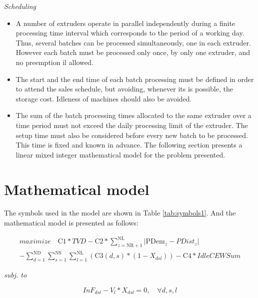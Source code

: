 \emph{Scheduling}

\begin{itemize}
\item A number of extruders operate in parallel independently during a finite processing time interval which corresponds to the period of a working day. Thus, several batches can be processed simultaneously, one in each extruder. However each batch must be processed only once, by only one extruder, and no preemption il allowed. 
\item The start and the end time of each batch processing must be defined in order to attend the sales schedule, but avoiding, whenever its is possible, the storage cost. Idleness of machines should also be avoided.
\item The sum of the batch processing times allocated to the same extruder over a time period must not exceed the daily processing limit of the extruder. The setup time must also be considered before every new batch to be processed. This time is fixed and known in advance. The following section presents a linear mixed integer mathematical model for the problem presented.
\end{itemize}

\section{Mathematical model}

The symbols used in the model are shown in Table \ref{tab:symbols1}. And the mathematical model is
presented as follows:

\begin{eqnarray} 
\label{eq:objFunc}
	 maximize \quad 
	 \mathrm{C1}*TVD 
	 - \mathrm{C2}*\sum_{z=\mathrm{NR}+1}^{\mathrm{NL}}{|\mathrm{PDem}_{z} 
	 - PDist_{z}|} \\ \nonumber 
	- \sum_{d=1}^{\mathrm{ND}}{\sum_{s=1}^{\mathrm{NS}}{\sum_{l=1}^{\mathrm{NL}}{(\mathrm{C3}(d,s)*(1-X_{dsl}))}}} - \mathrm{C4}*IdleCEWSum
\end{eqnarray}

\emph{subj. to}

\begin{equation}
	InF_{dsl} - V_{l} * X_{dsl} = 0, \quad \forall{d, s, l}
	\label{eq:evalInF}
\end{equation}


